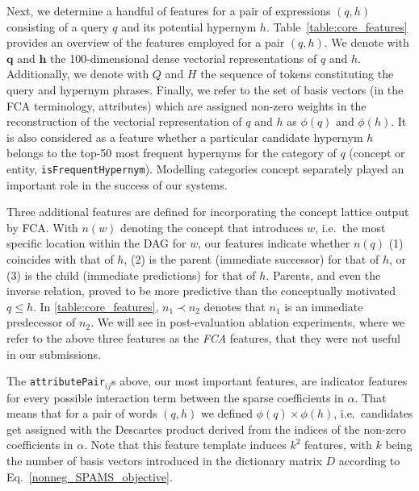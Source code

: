 \documentclass[11pt,a4paper]{article}
\begin{document}
Next, we determine a handful of features for a pair of expressions $(q, h)$
consisting of a query $q$ and its potential hypernym $h$.
Table~\ref{table:core_features} provides an overview of the features
employed for a pair $(q, h)$.
We denote with $\mathbf{q}$ and $\mathbf{h}$ the 100-dimensional dense
vectorial representations of $q$ and $h$.
Additionally, we denote with $Q$ and $H$ the sequence of tokens constituting
the query and hypernym phrases.
Finally, we refer to the set of basis vectors (in the FCA terminology,
attributes) which are assigned non-zero weights in the reconstruction of the
vectorial representation of $q$ and $h$ as $\phi(q)$ and $\phi(h)$.  
It is also considered as a feature whether a
particular candidate hypernym $h$ belongs to the top-50 most frequent hypernyms
for the category of $q$ (concept or entity, \texttt{isFrequentHypernym}).
Modelling categories concept separately played an important role in the success
of our systems.

Three additional features are defined for incorporating the concept lattice
output by FCA. With $n(w)$ denoting the concept that introduces $w$, i.e.~the
most specific location within the DAG for $w$, our features indicate whether
$n(q)$ 
(1) coincides with that of $h$,
(2) is the parent (immediate successor) for that of $h$, or
(3) is the child (immediate predictions) for that of $h$.
Parents, and even the inverse relation, proved to be more predictive
than the conceptually motivated  $q\le h$.
In \autoref{table:core_features}, $n_1\prec n_2$ denotes that $n_1$ is an
immediate predecessor of $n_2$.
We will see in post-evaluation ablation experiments, where we refer to the
above three features as the \emph{FCA} features, that they were not useful in
our submissions.



The \texttt{attributePair}$_{ij}$s above, our most important features, are 
indicator features for every possible interaction term 
between the sparse coefficients in $\alpha$. That means that for a pair of
words $(q, h)$ we defined $\phi(q) \times \phi(h)$, i.e.~candidates
get assigned with the Descartes product derived from the indices of the non-zero
coefficients in $\alpha$. Note that this feature template induces $k^2$
features, with $k$ being the number of basis vectors introduced in the dictionary matrix $D$ according to Eq.~\ref{nonneg_SPAMS_objective}.
\end{document}
